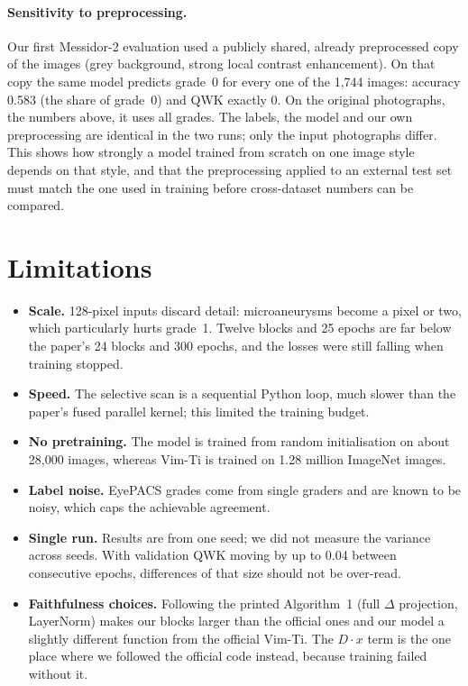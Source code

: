 \documentclass[11pt,a4paper]{article}
\begin{document}
\paragraph{Sensitivity to preprocessing.} Our first Messidor-2 evaluation used a
publicly shared, already preprocessed copy of the images (grey background,
strong local contrast enhancement). On that copy the same model predicts grade~0
for every one of the 1,744 images: accuracy 0.583 (the share of grade~0) and QWK
exactly 0. On the original photographs, the numbers above, it uses all grades.
The labels, the model and our own preprocessing are identical in the two runs; only
the input photographs differ. This shows how strongly a model trained from scratch
on one image style depends on that style, and that the preprocessing applied to an
external test set must match the one used in training before cross-dataset numbers
can be compared.

\section{Limitations}

\begin{itemize}
  \item \textbf{Scale.} 128-pixel inputs discard detail: microaneurysms become a
        pixel or two, which particularly hurts grade~1. Twelve blocks and 25 epochs
        are far below the paper's 24 blocks and 300 epochs, and the losses were
        still falling when training stopped.
  \item \textbf{Speed.} The selective scan is a sequential Python loop, much slower
        than the paper's fused parallel kernel; this limited the training budget.
  \item \textbf{No pretraining.} The model is trained from random initialisation on
        about 28,000 images, whereas Vim-Ti is trained on 1.28 million ImageNet
        images.
  \item \textbf{Label noise.} EyePACS grades come from single graders and are known
        to be noisy, which caps the achievable agreement.
  \item \textbf{Single run.} Results are from one seed; we did not measure the
        variance across seeds. With validation QWK moving by up to 0.04 between
        consecutive epochs, differences of that size should not be over-read.
  \item \textbf{Faithfulness choices.} Following the printed Algorithm~1 (full
        $\Delta$ projection, LayerNorm) makes our blocks larger than the official
        ones and our model a slightly different function from the official Vim-Ti.
        The $D\cdot x$ term is the one place where we followed the official code
        instead, because training failed without it.
\end{itemize}
\end{document}
